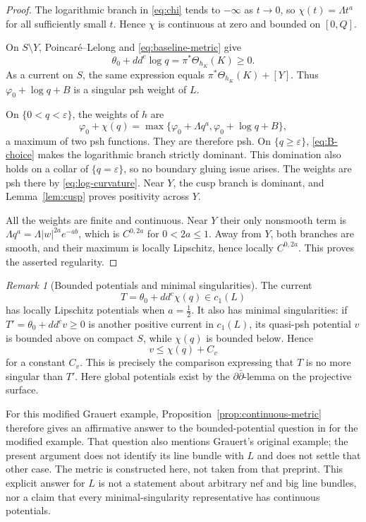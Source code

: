 \documentclass[11pt]{amsart}
\theoremstyle{definition}
\theoremstyle{remark}
\newtheorem{remark}[theorem]{Remark}
\numberwithin{equation}{section}
\newcommand{\ddc}{dd^c}
\begin{document}
\begin{proof}
The logarithmic branch in \eqref{eq:chi} tends to $-\infty$ as $t\to0$,
so $\chi(t)=\Lambda t^a$ for all sufficiently small $t$. Hence $\chi$ is
continuous at zero and bounded on $[0,Q]$.

On $S\setminus Y$, Poincar\'e--Lelong and
\eqref{eq:baseline-metric} give
\begin{equation}\label{eq:log-curvature}
 \theta_0+\ddc\log q=\pi^*\Theta_{h_K}(K)\ge0.
\end{equation}
As a current on $S$, the same expression equals
$\pi^*\Theta_{h_K}(K)+[Y]$. Thus $\varphi_0+\log q+B$ is a singular
psh weight of $L$.

On $\{0<q<\varepsilon\}$, the weights of $h$ are
\[
 \varphi_0+\chi(q)
 =\max\{\varphi_0+\Lambda q^a,\varphi_0+\log q+B\},
\]
a maximum of two psh functions. They are therefore psh. On
$\{q\ge\varepsilon\}$, \eqref{eq:B-choice} makes the logarithmic
branch strictly dominant. This domination also holds on a collar of
$\{q=\varepsilon\}$, so no boundary gluing issue arises. The weights
are psh there by \eqref{eq:log-curvature}. Near $Y$, the cusp branch is
dominant, and Lemma~\ref{lem:cusp} proves positivity across $Y$.

All the weights are finite and continuous. Near $Y$ their only
nonsmooth term is $\Lambda q^a=\Lambda|w|^{2a}e^{-ab}$,
which is $C^{0,2a}$ for $0<2a\le1$.
Away from $Y$, both branches are smooth, and their maximum is locally
Lipschitz, hence locally $C^{0,2a}$. This proves the asserted regularity.
\end{proof}

\begin{remark}[Bounded potentials and minimal singularities]\label{rem:minimal}
The current
\[
 T=\theta_0+\ddc\chi(q)\in c_1(L)
\]
has locally Lipschitz potentials when $a=\tfrac12$. It also has minimal
singularities: if $T'=\theta_0+\ddc v\ge0$ is another positive current
in $c_1(L)$, its quasi-psh potential $v$ is bounded above on compact
$S$, while $\chi(q)$ is bounded below. Hence
\[
 v\le\chi(q)+C_v
\]
for a constant $C_v$. This is precisely the comparison expressing that
$T$ is no more singular than $T'$. Here global potentials exist by the
$\partial\bar\partial$-lemma on the projective surface.

For this modified Grauert example, Proposition~\ref{prop:continuous-metric}
therefore gives an affirmative answer to the bounded-potential question
in \cite[Section~4]{Zhang2025} for the modified example. That question
also mentions Grauert's original example; the present argument does
not identify its line bundle with $L$ and does not settle that other
case. The metric is constructed here, not taken from that preprint.
This explicit answer for $L$ is not a statement about arbitrary nef
and big line bundles, nor a claim that every minimal-singularity
representative has continuous potentials.
\end{remark}
\end{document}
